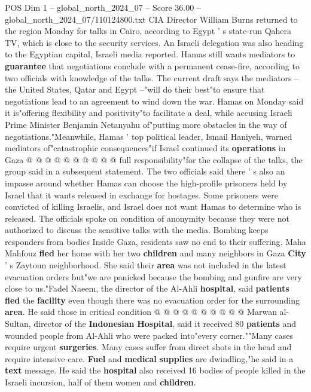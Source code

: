 \begin{textsample}{POS Dim 1 – global\_north\_2024\_07 – Score 36.00 – global\_north\_2024\_07/110124800.txt}
CIA Director William Burns returned to the region Monday for talks in Cairo, according to Egypt ' s state-run Qahera TV, which is close to the security services.
An Israeli delegation was also heading to the Egyptian capital, Israeli media reported.
Hamas still wants mediators to \textbf{guarantee} that negotiations conclude with a permanent cease-fire, according to two officials with knowledge of the talks.
The current draft says the mediators -- the United States, Qatar and Egypt --"will do their best"to ensure that negotiations lead to an agreement to wind down the war.
Hamas on Monday said it is"offering flexibility and positivity"to facilitate a deal, while accusing Israeli Prime Minister Benjamin Netanyahu of"putting more obstacles in the way of negotiations."Meanwhile, Hamas ' top political leader, Ismail Haniyeh, warned mediators of"catastrophic consequences"if Israel continued its \textbf{operations} in Gaza @ @ @ @ @ @ @ @ @ @ full responsibility"for the collapse of the talks, the group said in a subsequent statement.
The two officials said there ' s also an impasse around whether Hamas can choose the high-profile prisoners held by Israel that it wants released in exchange for hostages.
Some prisoners were convicted of killing Israelis, and Israel does not want Hamas to determine who is released.
The officials spoke on condition of anonymity because they were not authorized to discuss the sensitive talks with the media.
Bombing keeps responders from bodies Inside Gaza, residents saw no end to their suffering.
Maha Mahfouz \textbf{fled} her home with her two \textbf{children} and many neighbors in Gaza \textbf{City} ' s Zaytoun neighborhood.
She said their \textbf{area} was not included in the latest evacuation orders but"we are panicked because the bombing and gunfire are very close to us."Fadel Naeem, the director of the Al-Ahli \textbf{hospital}, said \textbf{patients} \textbf{fled} the \textbf{facility} even though there was no evacuation order for the surrounding \textbf{area}.
He said those in critical condition @ @ @ @ @ @ @ @ @ @ Marwan al-Sultan, director of the \textbf{Indonesian} \textbf{Hospital}, said it received 80 \textbf{patients} and wounded people from Al-Ahli who were packed into"every corner.""Many cases require urgent \textbf{surgeries}.
Many cases suffer from direct shots in the head and require intensive care. \textbf{Fuel} and \textbf{medical} \textbf{supplies} are dwindling,"he said in a \textbf{text} message.
He said the \textbf{hospital} also received 16 bodies of people killed in the Israeli incursion, half of them women and \textbf{children}.

\end{textsample}
